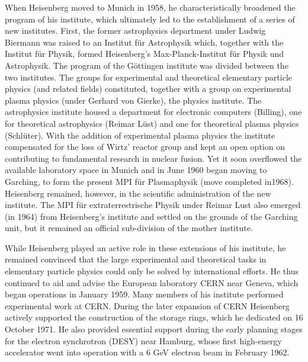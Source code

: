\documentclass{article}
\begin{document}
When Heisenberg moved to Munich in 1958, he characteristically broadened the program of his institute, which ultimately led to the establishment of a series of new institutes. First, the former astrophysics department under Ludwig Biermann was raised to an Institut für Astrophysik which, together with the Institut für Physik, formed Heisenberg's Max-Planck-Institut für Physik und Astrophysik. The program of the Göttingen institute was divided between the two institutes. The groups for experimental and theoretical elementary particle physics (and related fields) constituted, together with a group on experimental plasma physics (under Gerhard von Gierke), the physics institute. The astrophysics institute housed a department for electronic computers (Billing), one for theoretical astrophysics (Reimar Lüst) and one for theoretical plasma physics (Schlüter). With the addition of experimental plasma physics the institute compensated for the loss of Wirtz' reactor group and kept an open option on contributing to fundamental research in nuclear fusion. Yet it soon overflowed the available laboratory space in Munich and in June 1960 began moving to Garching, to form the present MPI für Plasmaphysik (move completed in1968). Heisenberg remained, however, in the scientific administration of the new institute. The MPI für extraterrestrische Physik under Reimar Lust also emerged (in 1964) from Heisenberg's institute and settled on the grounds of the Garching unit, but it remained an official sub-division of the mother institute.

While Heisenberg played an active role in these extensions of his institute, he remained convinced that the large experimental and theoretical tasks in elementary particle physics could only be solved by international efforts. He thus continued to aid and advise the European laboratory CERN near Geneva, which began operations in January 1959. Many members of his institute performed experimental work at CERN. During the later expansion of CERN Heisenberg actively supported the construction of the storage rings, which he dedicated on 16 October 1971. He also provided essential support during the early planning stages for the electron synchrotron (DESY) near Hamburg, whose first high-energy accelerator went into operation with a 6 GeV electron beam in February 1962.
\end{document}
